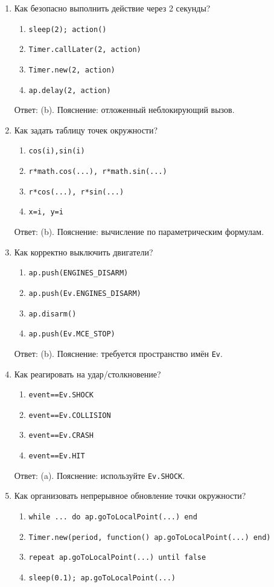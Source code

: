 \begin{enumerate}
  \item Как безопасно выполнить действие через 2 секунды? 
  \begin{enumerate}[label=(\alph*)] \item \texttt{sleep(2); action()} \item \texttt{Timer.callLater(2, action)} \item \texttt{Timer.new(2, action)} \item \texttt{ap.delay(2, action)} \end{enumerate}
  Ответ: (b). Пояснение: отложенный неблокирующий вызов.
  \item Как задать таблицу точек окружности? 
  \begin{enumerate}[label=(\alph*)] \item \texttt{{cos(i),sin(i)}} \item \texttt{{r*math.cos(...), r*math.sin(...)}} \item \texttt{{r*cos(...), r*sin(...)}} \item \texttt{{x=i, y=i}} \end{enumerate}
  Ответ: (b). Пояснение: вычисление по параметрическим формулам.
  \item Как корректно выключить двигатели? 
  \begin{enumerate}[label=(\alph*)] \item \texttt{ap.push(ENGINES\_DISARM)} \item \texttt{ap.push(Ev.ENGINES\_DISARM)} \item \texttt{ap.disarm()} \item \texttt{ap.push(Ev.MCE\_STOP)} \end{enumerate}
  Ответ: (b). Пояснение: требуется пространство имён \texttt{Ev}.
  \item Как реагировать на удар/столкновение? 
  \begin{enumerate}[label=(\alph*)] \item \texttt{event==Ev.SHOCK} \item \texttt{event==Ev.COLLISION} \item \texttt{event==Ev.CRASH} \item \texttt{event==Ev.HIT} \end{enumerate}
  Ответ: (a). Пояснение: используйте \texttt{Ev.SHOCK}.
  \item Как организовать непрерывное обновление точки окружности? 
  \begin{enumerate}[label=(\alph*)] \item \texttt{while ... do ap.goToLocalPoint(...) end} \item \texttt{Timer.new(period, function() ap.goToLocalPoint(...) end)} \item \texttt{repeat ap.goToLocalPoint(...) until false} \item \texttt{sleep(0.1); ap.goToLocalPoint(...)} \end{enumerate}

\end{enumerate}
